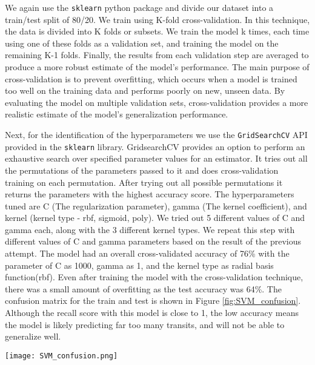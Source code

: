 \documentclass{article}
\begin{document}
We again use the \texttt{sklearn} python package and divide our dataset into a train/test split of 80/20. We train using K-fold cross-validation. In this technique, the data is divided into K folds or subsets. We train the model k times, each time using one of these folds as a validation set, and training the model on the remaining K-1 folds. Finally, the results from each validation step are averaged to produce a more robust estimate of the model’s performance. The main purpose of cross-validation is to prevent overfitting, which occurs when a model is trained too well on the training data and performs poorly on new, unseen data. By evaluating the model on multiple validation sets, cross-validation provides a more realistic estimate of the model’s generalization performance.

Next, for the identification of the hyperparameters we use the \texttt{GridSearchCV} API provided in the \texttt{sklearn} library. GridsearchCV provides an option to perform an exhaustive search over specified parameter values for an estimator. It tries out all the permutations of the parameters passed to it and does cross-validation training on each permutation. After trying out all possible permutations it returns the parameters with the highest accuracy score. The hyperparameters tuned are C (The regularization parameter), gamma (The kernel coefficient), and kernel (kernel type - rbf, sigmoid, poly). We tried out 5 different values of C and gamma each, along with the 3 different kernel types. We repeat this step with different values of C and gamma parameters based on the result of the previous attempt. The model had an overall cross-validated accuracy of 76\% with the parameter of C as 1000, gamma as 1, and the kernel type as radial basis function(rbf). Even after training the model with the cross-validation technique, there was a small amount of overfitting as the test accuracy was 64\%. The confusion matrix for the train and test is shown in Figure \ref{fig:SVM_confusion}. Although the recall score with this model is close to 1, the low accuracy means the model is likely predicting far too many transits, and will not be able to generalize well.  
\begin{figure*}[ht]
\centering
\texttt{[image: SVM\_confusion.png]}
\caption{A confusion matrix for our SVM classifier trained using kernel as rbf, C=1000, and gamma=1.}
\label{fig:SVM_confusion}
\end{figure*}
\end{document}

